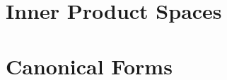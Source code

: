 \chapter{Inner Product Spaces}\label{chap:10}
	
	
	
	
	

\chapter{Canonical Forms}\label{chap:11}
	
	
	

